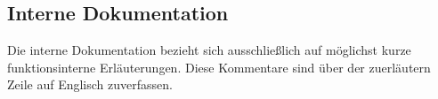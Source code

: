 \subsection{Interne Dokumentation}
Die interne Dokumentation bezieht sich ausschließlich auf möglichst kurze funktionsinterne Erläuterungen. Diese Kommentare sind über der zuerläutern Zeile auf Englisch zuverfassen.